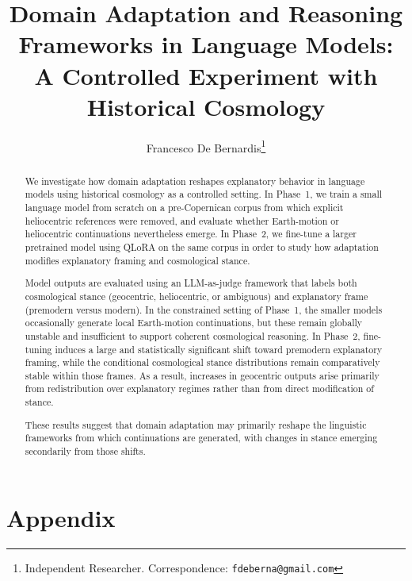 \documentclass{article}
\title{Domain Adaptation and Reasoning Frameworks in Language Models: A Controlled Experiment with Historical Cosmology}
\author{
Francesco De Bernardis\thanks{Independent Researcher. Correspondence: \texttt{fdeberna@gmail.com}}
}
\begin{document}



\maketitle

\begin{abstract}
We investigate how domain adaptation reshapes explanatory behavior in language models using historical cosmology as a controlled setting. In Phase~1, we train a small language model from scratch on a pre-Copernican corpus from which explicit heliocentric references were removed, and evaluate whether Earth-motion or heliocentric continuations nevertheless emerge. In Phase~2, we fine-tune a larger pretrained model using QLoRA on the same corpus in order to study how adaptation modifies explanatory framing and cosmological stance.

Model outputs are evaluated using an LLM-as-judge framework that labels both cosmological stance (geocentric, heliocentric, or ambiguous) and explanatory frame (premodern versus modern). In the constrained setting of Phase~1, the smaller models occasionally generate local Earth-motion continuations, but these remain globally unstable and insufficient to support coherent cosmological reasoning. In Phase~2, fine-tuning induces a large and statistically significant shift toward premodern explanatory framing, while the conditional cosmological stance distributions remain comparatively stable within those frames. As a result, increases in geocentric outputs arise primarily from redistribution over explanatory regimes rather than from direct modification of stance.

These results suggest that domain adaptation may primarily reshape the linguistic frameworks from which continuations are generated, with changes in stance emerging secondarily from those shifts.

\end{abstract}
\vspace{1em}






% 




\newpage
\appendix
\section*{Appendix}



\newpage
% 


\end{document}
